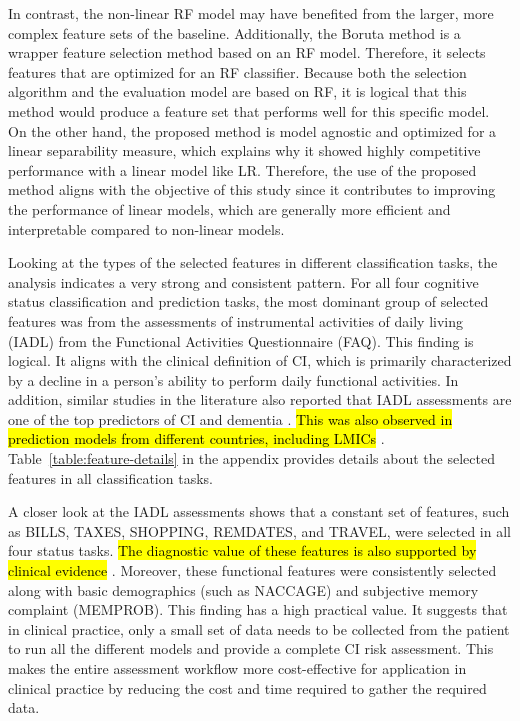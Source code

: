 In contrast, the non-linear RF model may have benefited from the larger, more complex feature sets of the baseline. Additionally, the Boruta method is a wrapper feature selection method based on an RF model. Therefore, it selects features that are optimized for an RF classifier. Because both the selection algorithm and the evaluation model are based on RF, it is logical that this method would produce a feature set that performs well for this specific model. On the other hand, the proposed method is model agnostic and optimized for a linear separability measure, which explains why it showed highly competitive performance with a linear model like LR. Therefore, the use of the proposed method aligns with the objective of this study since it contributes to improving the performance of linear models, which are generally more efficient and interpretable compared to non-linear models. 

Looking at the types of the selected features in different classification tasks, the analysis indicates a very strong and consistent pattern. For all four cognitive status classification and prediction tasks, the most dominant group of selected features was from the assessments of instrumental activities of daily living (\acrshort{IADL}) from the Functional Activities Questionnaire (\acrshort{FAQ}). This finding is logical. It aligns with the clinical definition of CI, which is primarily characterized by a decline in a person's ability to perform daily functional activities. In addition, similar studies in the literature also reported that IADL assessments are one of the top predictors of CI and dementia \cite{abbas2024Explainable, Ren2023Improving, Richter2025Cognitive}. \hl{This was also observed in prediction models from different countries, including LMICs} \cite{Cui2024Prediction, Ren2025Using}. Table~\ref{table:feature-details} in the appendix provides details about the selected features in all classification tasks.

A closer look at the IADL assessments shows that a constant set of features, such as BILLS, TAXES, SHOPPING, REMDATES, and TRAVEL, were selected in all four status tasks. \hl{The diagnostic value of these features is also supported by clinical evidence} \cite{Teng2010Utility}. Moreover, these functional features were consistently selected along with basic demographics (such as NACCAGE) and subjective memory complaint (MEMPROB). This finding has a high practical value. It suggests that in clinical practice, only a small set of data needs to be collected from the patient to run all the different models and provide a complete CI risk assessment. This makes the entire assessment workflow more cost-effective for application in clinical practice by reducing the cost and time required to gather the required data. 

